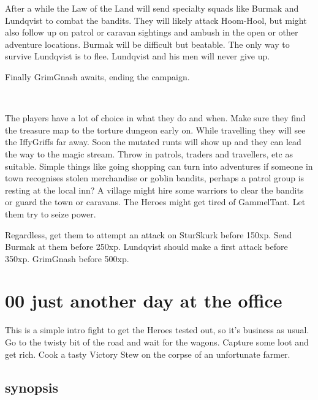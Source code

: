 After a while the Law of the Land will send specialty squads like Burmak and Lundqvist to combat the bandits. They will likely attack Hoom-Hool, but might also follow up on patrol or caravan sightings and ambush in the open or other adventure locations. Burmak will be difficult but beatable. The only way to survive Lundqvist is to flee. Lundqvist and his men will never give up. 

Finally GrimGnash awaits, ending the campaign.

\

The players have a lot of choice in what they do and when. Make sure they find the treasure map to the torture dungeon early on. While travelling they will see the IffyGriffs far away. Soon the mutated runts will show up and they can lead the way to the magic stream. Throw in patrols, traders and travellers, etc as suitable. Simple things like going shopping can turn into adventures if someone in town recognises stolen merchandise or goblin bandits, perhaps a patrol group is resting at the local inn? A village might hire some warriors to clear the bandits or guard the town or caravans. The Heroes might get tired of GammelTant. Let them try to seize power.

Regardless, get them to attempt an attack on SturSkurk before 150xp. Send Burmak at them before 250xp. Lundqvist should make a first attack before 350xp. GrimGnash before 500xp.








\newpage
\section*{00 just another day at the office}

This is a simple intro fight to get the Heroes tested out, so it's business as usual. Go to the twisty bit of the road and wait for the wagons. Capture some loot and get rich. Cook a tasty Victory Stew on the corpse of an unfortunate farmer.


\subsection*{synopsis}


